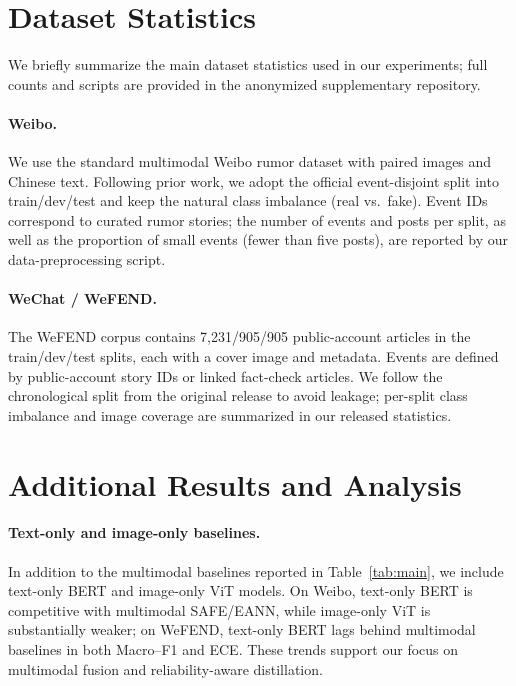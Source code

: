 \section{Dataset Statistics}
\label{app:data}

We briefly summarize the main dataset statistics used in our experiments; full counts and scripts are provided in the anonymized supplementary repository.

\paragraph{Weibo.} We use the standard multimodal Weibo rumor dataset with paired images and Chinese text. Following prior work, we adopt the official event-disjoint split into train/dev/test and keep the natural class imbalance (real vs.~fake). Event IDs correspond to curated rumor stories; the number of events and posts per split, as well as the proportion of small events (fewer than five posts), are reported by our data-preprocessing script.

\paragraph{WeChat / WeFEND.} The WeFEND corpus contains 7,231/905/905 public-account articles in the train/dev/test splits, each with a cover image and metadata. Events are defined by public-account story IDs or linked fact-check articles. We follow the chronological split from the original release to avoid leakage; per-split class imbalance and image coverage are summarized in our released statistics.

\section{Additional Results and Analysis}
\label{app:results}

\paragraph{Text-only and image-only baselines.} In addition to the multimodal baselines reported in Table~\ref{tab:main}, we include text-only BERT and image-only ViT models. On Weibo, text-only BERT is competitive with multimodal SAFE/EANN, while image-only ViT is substantially weaker; on WeFEND, text-only BERT lags behind multimodal baselines in both Macro--F1 and ECE. These trends support our focus on multimodal fusion and reliability-aware distillation.

